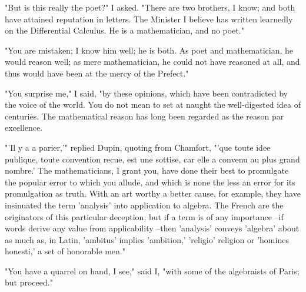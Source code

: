 \documentclass{article}
\begin{document}
"But is this really the poet?" I asked. "There are two brothers, I know; and both have attained reputation in letters. The Minister I believe has written learnedly on the Differential Calculus. He is a mathematician, and no poet."

"You are mistaken; I know him well; he is both. As poet and mathematician, he would reason well; as mere mathematician, he could not have reasoned at all, and thus would have been at the mercy of the Prefect."

"You surprise me," I said, "by these opinions, which have been contradicted by the voice of the world. You do not mean to set at naught the well-digested idea of centuries. The mathematical reason has long been regarded as the reason par excellence.

"'Il y a a parier,'" replied Dupin, quoting from Chamfort, "'que toute idee publique, toute convention recue, est une sottise, car elle a convenu au plus grand nombre.' The mathematicians, I grant you, have done their best to promulgate the popular error to which you allude, and which is none the less an error for its promulgation as truth. With an art worthy a better cause, for example, they have insinuated the term 'analysis' into application to algebra. The French are the originators of this particular deception; but if a term is of any importance --if words derive any value from applicability --then 'analysis' conveys 'algebra' about as much as, in Latin, 'ambitus' implies 'ambition,' 'religio' religion or 'homines honesti,' a set of honorable men."

"You have a quarrel on hand, I see," said I, "with some of the algebraists of Paris; but proceed."
\end{document}
